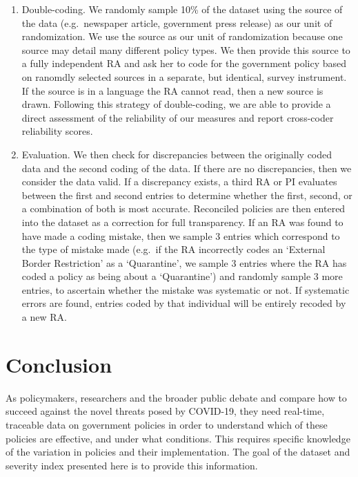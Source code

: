 \documentclass[]{article}
\begin{document}
\begin{enumerate}
\def\labelenumi{\arabic{enumi}.}
\item
  Double-coding. We randomly sample 10\% of the dataset using the source of the data (e.g.~newspaper article, government press release) as our unit of randomization. We use the source as our unit of randomization because one source may detail many different policy types. We then provide this source to a fully independent RA and ask her to code for the government policy based on ranomdly selected sources in a separate, but identical, survey instrument. If the source is in a language the RA cannot read, then a new source is drawn. Following this strategy of double-coding, we are able to provide a direct assessment of the reliability of our measures and report cross-coder reliability scores.
\item
  Evaluation. We then check for discrepancies between the originally coded data and the second coding of the data. If there are no discrepancies, then we consider the data valid. If a discrepancy exists, a third RA or PI evaluates between the first and second entries to determine whether the first, second, or a combination of both is most accurate. Reconciled policies are then entered into the dataset as a correction for full transparency. If an RA was found to have made a coding mistake, then we sample 3 entries which correspond to the type of mistake made (e.g.~if the RA incorrectly codes an `External Border Restriction' as a `Quarantine', we sample 3 entries where the RA has coded a policy as being about a `Quarantine') and randomly sample 3 more entries, to ascertain whether the mistake was systematic or not. If systematic errors are found, entries coded by that individual will be entirely recoded by a new RA.
\end{enumerate}

\hypertarget{conclusion}{%
\section{Conclusion}\label{conclusion}}

As policymakers, researchers and the broader public debate and compare how to succeed against the novel threats posed by COVID-19, they need real-time, traceable data on government policies in order to understand which of these policies are effective, and under what conditions. This requires specific knowledge of the variation in policies and their implementation. The goal of the dataset and severity index presented here is to provide this information.
\end{document}
